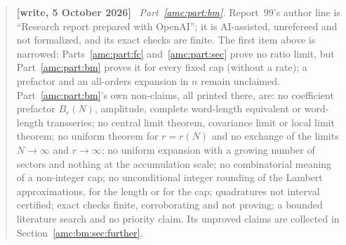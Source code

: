 \documentclass[11pt,letterpaper]{article}
\theoremstyle{remark}\newtheorem{remark}[theorem]{Remark}
\newenvironment{writenotedated}[1]{\par\smallskip\begin{quote}\small\textbf{[write, #1]}\ }{\end{quote}\smallskip}
\begin{document}
\begin{writenotedated}{5 October 2026}
\emph{Part~\ref{amc:part:bm}.} Report~99's author line is ``Research report prepared with OpenAI''; it is AI-assisted, unrefereed and not formalized, and its exact checks are finite. The first item above is narrowed: Parts~\ref{amc:part:fc} and~\ref{amc:part:sec} prove no ratio limit, but Part~\ref{amc:part:bm} proves it for every fixed cap (without a rate); a prefactor and an all-orders expansion in $n$ remain unclaimed. Part~\ref{amc:part:bm}'s own non-claims, all printed there, are: no coefficient prefactor $B_r(N)$, amplitude, complete word-length equivalent or word-length transseries; no central limit theorem, covariance limit or local limit theorem; no uniform theorem for $r=r(N)$ and no exchange of the limits $N\to\infty$ and $r\to\infty$; no uniform expansion with a growing number of sectors and nothing at the accumulation scale; no combinatorial meaning of a non-integer cap; no unconditional integer rounding of the Lambert approximations, for the length or for the cap; quadratures not interval certified; exact checks finite, corroborating and not proving; a bounded literature search and no priority claim. Its unproved claims are collected in Section~\ref{amc:bm:sec:further}.
\end{writenotedated}
\end{document}
